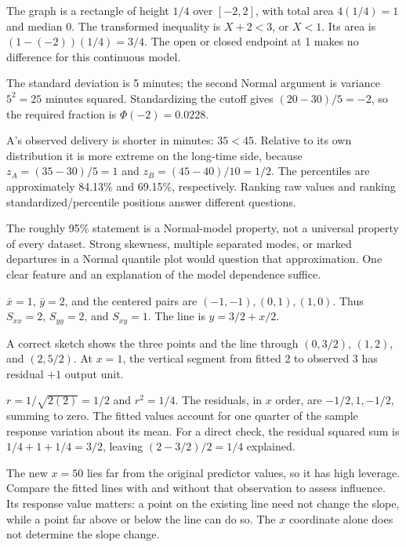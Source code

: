 \documentclass[11pt]{article}
\begin{document}
\begin{parts}
\item The graph is a rectangle of height $1/4$ over $[-2,2]$, with total area $4(1/4)=1$ and median 0. The transformed inequality is $X+2<3$, or $X<1$. Its area is $(1-(-2))(1/4)=3/4$. The open or closed endpoint at 1 makes no difference for this continuous model.
\item The standard deviation is 5 minutes; the second Normal argument is variance $5^2=25$ minutes squared. Standardizing the cutoff gives $(20-30)/5=-2$, so the required fraction is $\Phi(-2)=0.0228$.
\item A's observed delivery is shorter in minutes: $35<45$. Relative to its own distribution it is more extreme on the long-time side, because $z_A=(35-30)/5=1$ and $z_B=(45-40)/10=1/2$. The percentiles are approximately 84.13\% and 69.15\%, respectively. Ranking raw values and ranking standardized/percentile positions answer different questions.
\item The roughly 95\% statement is a Normal-model property, not a universal property of every dataset. Strong skewness, multiple separated modes, or marked departures in a Normal quantile plot would question that approximation. One clear feature and an explanation of the model dependence suffice.
\end{parts}

\begin{parts}
\item $\bar x=1$, $\bar y=2$, and the centered pairs are $(-1,-1),(0,1),(1,0)$. Thus $S_{xx}=2$, $S_{yy}=2$, and $S_{xy}=1$. The line is $\widehat y=3/2+x/2$.
\item A correct sketch shows the three points and the line through $(0,3/2)$, $(1,2)$, and $(2,5/2)$. At $x=1$, the vertical segment from fitted 2 to observed 3 has residual $+1$ output unit.
\item $r=1/\sqrt{2(2)}=1/2$ and $r^2=1/4$. The residuals, in $x$ order, are $-1/2,1,-1/2$, summing to zero. The fitted values account for one quarter of the sample response variation about its mean. For a direct check, the residual squared sum is $1/4+1+1/4=3/2$, leaving $(2-3/2)/2=1/4$ explained.
\item The new $x=50$ lies far from the original predictor values, so it has high leverage. Compare the fitted lines with and without that observation to assess influence. Its response value matters: a point on the existing line need not change the slope, while a point far above or below the line can do so. The $x$ coordinate alone does not determine the slope change.
\end{parts}
\end{document}
